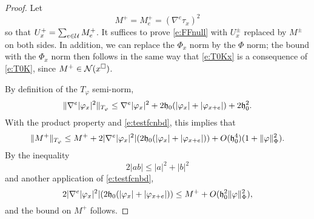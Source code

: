 \begin{proof}
Let
\begin{equation}
M^+ = M^+_e = (\nabla^e \tau_x)^2
\end{equation}
so that $U^+_x = \sum_{e\in\mathcal{U}} M^+_e$.
It suffices to prove \eqref{e:FFnull} with $U^\pm_x$ replaced by $M^\pm$
on both sides.
In addition, we can replace the $\Phi_x$ norm by the $\Phi$ norm;
the bound with the $\Phi_x$ norm then follows in the same way that \eqref{e:T0Kx} is a consequence of \eqref{e:T0K},
since $M^+ \in \mathcal{N}(x^\Box)$.


By definition of the $T_\varphi$ semi-norm,
\begin{equation}
\label{e:nabla-phi-sq-bd}
\|\nabla^e |\varphi_x|^2\|_{T_\varphi}
  \le
\nabla^e |\varphi_x|^2 + 2 \mathfrak{h}_0 (|\varphi_x| + |\varphi_{x+e}|) + 2 \mathfrak{h}_0^2.
\end{equation}
With the product property
and \eqref{e:testfcnbd}, this implies that
\begin{equation}
\|M^+\|_{T_\varphi}
  \le
M^+
  + 2 |\nabla^e |\varphi_x|^2| (2 \mathfrak{h}_0 (|\varphi_x| + |\varphi_{x+e}|))
  + O(\mathfrak{h}_0^4) (1 + \|\varphi\|^2_\Phi).
\end{equation}
By the inequality
\begin{equation}
\label{e:young-ineq}
2|ab| \le |a|^2 + |b|^2
\end{equation}
and another application of \eqref{e:testfcnbd},
\begin{equation}
2 |\nabla^e |\varphi_x|^2| (2 \mathfrak{h}_0 (|\varphi_x| + |\varphi_{x+e}|))
  \le
M^+ + O(\mathfrak{h}_0^2 \|\varphi\|^2_\Phi),
\end{equation}
and the bound on $M^+$ follows.


\end{proof}
